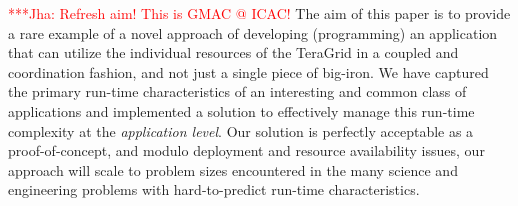 \documentclass[conference,final]{IEEEtran}
\newcommand{\jhanote}[1]{ {\textcolor{red} { ***Jha: #1 }}}
\newcommand{\jhanote}[1]{}
\begin{document}
\jhanote{Refresh aim! This is GMAC @ ICAC!}  The aim of this paper is
to provide a rare example of a novel approach of developing
(programming) an application that can utilize the individual resources
of the TeraGrid in a coupled and coordination fashion, and not just a
single piece of big-iron.  We have captured the primary run-time
characteristics of an interesting and common class of applications and
implemented a solution to effectively manage this run-time complexity
at the {\it application level}.  Our solution is perfectly acceptable
as a proof-of-concept, and modulo deployment and resource availability
issues, our approach will scale to problem sizes encountered in the
many science and engineering problems with hard-to-predict run-time
characteristics.








\end{document}
